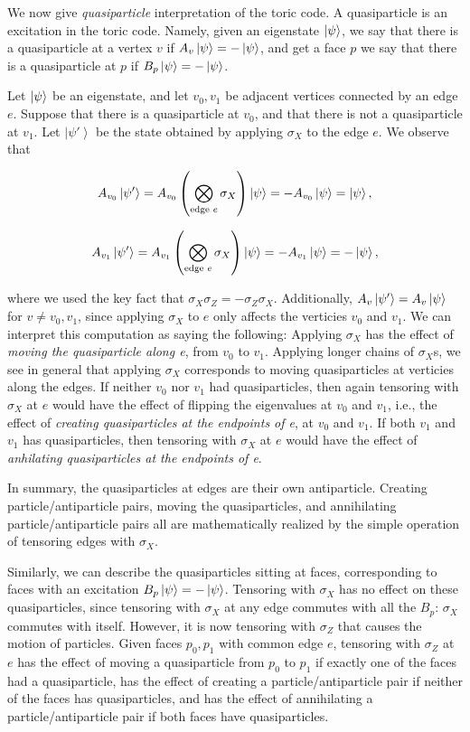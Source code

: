 \documentclass{article}
\theoremstyle{definition}
\numberwithin{figure}{section}
\begin{document}
We now give \textit{quasiparticle} interpretation of the toric code. A quasiparticle is an excitation in the toric code. Namely, given an eigenstate $\left|\psi\right>$, we say that there is a quasiparticle at a vertex $v$ if $A_v\left|\psi\right>=-\left|\psi\right>$, and get a face $p$ we say that there is a quasiparticle at $p$ if $B_p\left|\psi\right>=-\left|\psi\right>$.

Let $\left|\psi\right>$ be an eigenstate, and let $v_0,v_1$ be adjacent vertices connected by an edge $e$. Suppose that there is a quasiparticle at $v_0$, and that there is not a quasiparticle at $v_1$. Let $\left| \psi'\right>$ be the state obtained by applying $\sigma_X$ to the edge $e$. We observe that

$$A_{v_0}\left| \psi'\right> = A_{v_0}\left(\bigotimes_{\text{edge }e}\sigma_X\right)\left|\psi\right>=-A_{v_0}\left|\psi\right>=\left|\psi\right>,$$

$$A_{v_1}\left| \psi'\right> = A_{v_1}\left(\bigotimes_{\text{edge }e}\sigma_X\right)\left|\psi\right>=-A_{v_1}\left|\psi\right>=-\left|\psi\right>,$$

where we used the key fact that $\sigma_X\sigma_Z=-\sigma_Z\sigma_X$. Additionally, $A_{v}\left|\psi'\right>=A_{v}\left|\psi\right>$ for $v\neq v_0,v_1$, since applying $\sigma_X$ to $e$ only affects the verticies $v_0$ and $v_1$. We can interpret this computation as saying the following: Applying $\sigma_X$ has the effect of \textit{moving the quasiparticle along e}, from $v_0$ to $v_1$. Applying longer chains of $\sigma_X$s, we see in general that applying $\sigma_X$ corresponds to moving quasiparticles at verticies along the edges. If neither $v_0$ nor $v_1$ had quasiparticles, then again tensoring with $\sigma_X$ at $e$ would have the effect of flipping the eigenvalues at $v_0$ and $v_1$, i.e., the effect of \textit{creating quasiparticles at the endpoints of e}, at $v_0$ and $v_1$. If both $v_1$ and $v_1$ has quasiparticles, then tensoring with $\sigma_X$ at $e$ would have the effect of \textit{anhilating quasiparticles at the endpoints of e}.

In summary, the quasiparticles at edges are their own antiparticle. Creating particle/antiparticle pairs, moving the quasiparticles, and annihilating particle/antiparticle pairs all are mathematically realized by the simple operation of tensoring edges with $\sigma_X$.

Similarly, we can describe the quasiparticles sitting at faces, corresponding to faces with an excitation $B_p\left|\psi\right>=-\left|\psi\right>$. Tensoring with $\sigma_X$ has no effect on these quasiparticles, since tensoring with $\sigma_X$ at any edge commutes with all the $B_p$: $\sigma_X$ commutes with itself. However, it is now tensoring with $\sigma_Z$ that causes the motion of particles. Given faces $p_0,p_1$ with common edge $e$, tensoring with $\sigma_Z$ at $e$ has the effect of moving a quasiparticle from $p_0$ to $p_1$ if exactly one of the faces had a quasiparticle, has the effect of creating a particle/antiparticle pair if neither of the faces has quasiparticles, and has the effect of annihilating a particle/antiparticle pair if both faces have quasiparticles.
\end{document}
